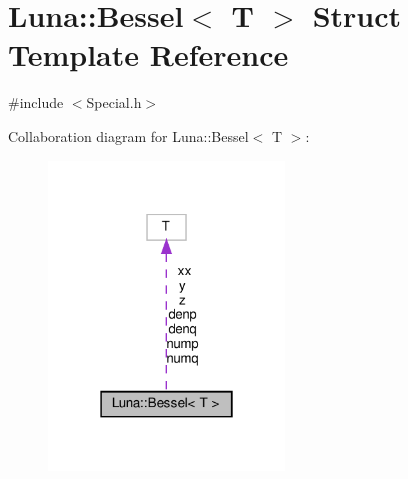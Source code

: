 \hypertarget{structLuna_1_1Bessel}{}\section{Luna\+:\+:Bessel$<$ T $>$ Struct Template Reference}
\label{structLuna_1_1Bessel}


{\ttfamily \#include $<$Special.\+h$>$}



Collaboration diagram for Luna\+:\+:Bessel$<$ T $>$\+:\nopagebreak
\begin{figure}[H]
\begin{center}
\leavevmode
\includegraphics[width=178pt]{structLuna_1_1Bessel__coll__graph}
\end{center}
\end{figure}

